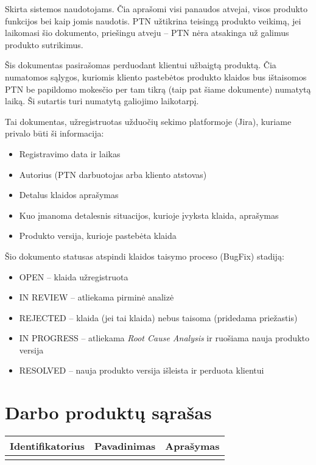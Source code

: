 \newcommand{\describeWorkProd}[2]{
    \expandafter\def\csname desc#1\endcsname{#2}
}
\newcommand{\printRow}[1]{
        \workProdId{#1} &
        \workProdName{#1} &
        \csname desc#1\endcsname \\ \hline
}
\newcommand{\workProdDescriptions}{
    \forlistloop{\printRow}{\WorkProdList}
}

\describeWorkProd{Manual}{Skirta sistemos naudotojams. Čia aprašomi visi panaudos atvejai, visos produkto funkcijos bei kaip jomis naudotis. PTN užtikrina teisingą produkto veikimą, jei laikomasi šio dokumento, priešingu atveju -- PTN nėra atsakinga už galimus produkto sutrikimus.
}

\describeWorkProd{Warranty}{Šis dokumentas pasirašomas perduodant klientui užbaigtą produktą. Čia numatomos sąlygos, kuriomis kliento pastebėtos produkto klaidos bus ištaisomos PTN be papildomo mokesčio per tam tikrą (taip pat šiame dokumente) numatytą laiką. Ši sutartis turi numatytą galiojimo laikotarpį.
}

\describeWorkProd{Ticket}{Tai dokumentas, užregistruotas užduočių sekimo platformoje (Jira), kuriame privalo būti ši informacija:
\begin{itemize}
    \item Registravimo data ir laikas
    \item Autorius (PTN darbuotojas arba kliento atstovas)
    \item Detalus klaidos aprašymas
    \item Kuo įmanoma detalesnis situacijos, kurioje įvyksta klaida, aprašymas
    \item Produkto versija, kurioje pastebėta klaida
\end{itemize}
Šio dokumento statusas atspindi klaidos taisymo proceso (BugFix) stadiją:
\begin{itemize}
    \item OPEN -- klaida užregistruota
    \item IN REVIEW -- atliekama pirminė analizė
    \item REJECTED -- klaida (jei tai klaida) nebus taisoma (pridedama priežastis)
    \item IN PROGRESS -- atliekama \textit{Root Cause Analysis} ir ruošiama nauja produkto versija
    \item RESOLVED -- nauja produkto versija išleista ir perduota klientui
\end{itemize}
}


\section{Darbo produktų sąrašas}

\begin{longtable}{|c|c|p{}|}
    \hline
    \textbf{Identifikatorius} & \textbf{Pavadinimas} & \textbf{Aprašymas} \\ \hline
    \workProdDescriptions
\end{longtable}